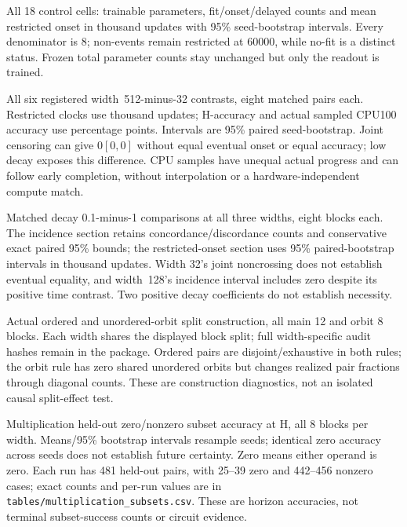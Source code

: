 \begin{table}[htbp]
\caption{All 18 control cells: trainable parameters, fit/onset/delayed counts and mean restricted onset in thousand updates with 95\% seed-bootstrap intervals. Every denominator is 8; non-events remain restricted at 60000, while no-fit is a distinct status. Frozen total parameter counts stay unchanged but only the readout is trained.}
\label{tab:scope}
\centering
\end{table}
\clearpage
\begin{table}[p]
\caption{All six registered width~512-minus-32 contrasts, eight matched pairs each. Restricted clocks use thousand updates; H-accuracy and actual sampled CPU100 accuracy use percentage points. Intervals are 95\% paired seed-bootstrap. Joint censoring can give $0[0,0]$ without equal eventual onset or equal accuracy; low decay exposes this difference. CPU samples have unequal actual progress and can follow early completion, without interpolation or a hardware-independent compute match.}
\label{tab:scope-contrasts}
\centering
\end{table}
\clearpage
\begin{table}[p]
\caption{Matched decay 0.1-minus-1 comparisons at all three widths, eight blocks each. The incidence section retains concordance/discordance counts and conservative exact paired 95\% bounds; the restricted-onset section uses 95\% paired-bootstrap intervals in thousand updates. Width 32's joint noncrossing does not establish eventual equality, and width~128's incidence interval includes zero despite its positive time contrast. Two positive decay coefficients do not establish necessity.}
\label{tab:decay}
\centering
\end{table}
\clearpage
\begin{table}[p]
\caption{Actual ordered and unordered-orbit split construction, all main 12 and orbit 8 blocks. Each width shares the displayed block split; full width-specific audit hashes remain in the package. Ordered pairs are disjoint/exhaustive in both rules; the orbit rule has zero shared unordered orbits but changes realized pair fractions through diagonal counts. These are construction diagnostics, not an isolated causal split-effect test.}
\label{tab:split}
\centering
\end{table}
\clearpage
\begin{table}[p]
\caption{Multiplication held-out zero/nonzero subset accuracy at H, all 8 blocks per width. Means/95\% bootstrap intervals resample seeds; identical zero accuracy across seeds does not establish future certainty. Zero means either operand is zero. Each run has 481 held-out pairs, with 25--39 zero and 442--456 nonzero cases; exact counts and per-run values are in \texttt{tables/multiplication\_subsets.csv}. These are horizon accuracies, not terminal subset-success counts or circuit evidence.}
\label{tab:multiplication}
\centering
\end{table}
\clearpage
